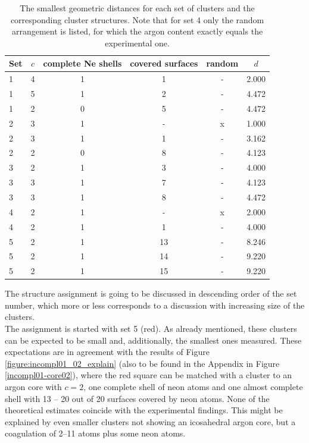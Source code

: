 \begin{table}[!h]
  \caption{The smallest geometric distances for each set of clusters
           and the corresponding cluster structures.
           Note that for set 4 only the random arrangement is listed,
           for which the argon content exactly equals the experimental one.}
  \centering
  \begin{tabular}{lccccc}
    \toprule
     Set  & $c$ & complete Ne shells & covered surfaces & random & $d$\\
    \midrule
      1   & 4   &          1         &        1         &   -    & 2.000\\
      1   & 5   &          1         &        2         &   -    & 4.472\\
      1   & 2   &          0         &        5         &   -    & 4.472\\
    \midrule
      2   & 3   &          1         &        -         &   x    & 1.000\\
      2   & 3   &          1         &        1         &   -    & 3.162\\
      2   & 2   &          0         &        8         &   -    & 4.123\\
    \midrule
      3   & 2   &          1         &        3         &   -    & 4.000\\
      3   & 3   &          1         &        7         &   -    & 4.123\\
      3   & 3   &          1         &        8         &   -    & 4.472\\
    \midrule
      4   & 2   &          1         &        -         &   x    & 2.000\\
      4   & 2   &          1         &        1         &   -    & 4.000\\
    \midrule
      5   & 2   &          1         &       13         &   -    & 8.246\\
      5   & 2   &          1         &       14         &   -    & 9.220\\
      5   & 2   &          1         &       15         &   -    & 9.220\\
    \bottomrule
  \end{tabular}
  \label{table:assignments}
\end{table}

The structure assignment is going to be discussed in descending order
of the set number, which more or less corresponds to a discussion with
increasing size of the clusters.\\
The assignment is started with set 5 (red). As already mentioned,
these clusters can be expected
to be small and, additionally, the smallest ones measured. These expectations are
in agreement with the results of Figure \ref{figure:incompl01_02_explain}
(also to be found in the
Appendix in Figure \ref{incompl01-core02}), where the red square
can be matched with a cluster to an argon core with $c=2$, one complete
shell of neon atoms 
and one almost complete
shell with 13 -- 20 out of 20 surfaces covered by neon atoms. None of the
theoretical estimates coincide with the experimental findings. This might be
explained by even smaller clusters not showing an icosahedral argon core, but
a coagulation of 2--11 atoms plus some neon atoms.

